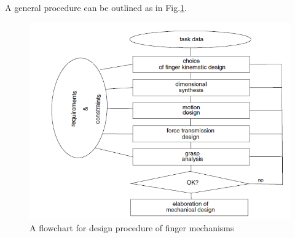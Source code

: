 \documentclass[a4paper, 10pt, conference]{ieeeconf}      %
\begin{document}
A general procedure can be outlined as in Fig.\ref{fig:design1}.
\begin{figure}[h!]
\centering
  \includegraphics[width=0.7\linewidth]{./images/design}
  \caption{A flowchart for design procedure of finger mechanisms}
  \label{fig:design1}
\end{figure}

\end{document}
